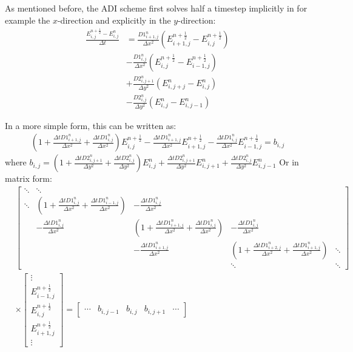 As mentioned before, the ADI scheme first solves half a timestep implicitly in for example the $x$-direction and explicitly in the $y$-direction:
\begin{align}
\frac{E_{i,j}^{n+\frac{1}{2}} - E_{i,j}^{n}}{\Delta t}
 &= \frac{D1_{i+1,j}^{n}}{\Delta x^2} (E_{i+1,j}^{n+\frac{1}{2}} - E_{i,j}^{n+\frac{1}{2}}) \\
 &- \frac{D1_{i,j}^{n}}{\Delta x^2} (E_{i,j}^{n+\frac{1}{2}} - E_{i-1,j}^{n+\frac{1}{2}}) \\
 &+ \frac{D2_{i,j+1}^{n}}{\Delta y^2} (E_{i,j+j}^{n} - E_{i,j}^{n}) \\
 &- \frac{D2_{i,j}^{n}}{\Delta y^2} (E_{i,j}^{n} - E_{i,j-1}^{n})
\end{align}

In a more simple form, this can be written as:
\begin{align}
\left(1 + \frac{\Delta t D1_{i+1,j}^{n}}{\Delta x^2} + \frac{\Delta t D1_{i,j}^{n}}{\Delta x^2} \right) E_{i,j}^{n+\frac{1}{2}} - \frac{\Delta t D1_{i+1,j}^{n}}{\Delta x^2} E_{i+1,j}^{n+\frac{1}{2}} - \frac{\Delta t D1_{i,j}^{n}}{\Delta x^2} E_{i-1,j}^{n+\frac{1}{2}} = b_{i,j}
\end{align}
where $b_{i,j} = \left(1 + \frac{\Delta t D2_{i,j+1}^{n}}{\Delta y^2} + \frac{\Delta t D2_{i,j}^{n}}{\Delta y^2}\right) E_{i,j}^{n} + \frac{\Delta t D2_{i,j+1}^{n}}{\Delta y^2} E_{i,j+1}^{n} + \frac{\Delta t D2_{i,j}^{n}}{\Delta y^2} E_{i,j-1}^{n}$
Or in matrix form:
\begin{align}
&\begin{bmatrix}
\ddots & \ddots & & &\\
\ddots & \left(1 + \frac{\Delta t D1_{i,j}^{n}}{\Delta x^2} + \frac{\Delta t D1_{i-1,j}^{n}}{\Delta x^2} \right) & -\frac{\Delta t D1_{i,j}^{n}}{\Delta x^2} & & \\
& -\frac{\Delta t D1_{i,j}^{n}}{\Delta x^2} & \left(1 + \frac{\Delta t D1_{i+1,j}^{n}}{\Delta x^2} + \frac{\Delta t D1_{i,j}^{n}}{\Delta x^2} \right) & - \frac{\Delta t D1_{i,j}^{n}}{\Delta x^2} & \\
& & -\frac{\Delta t D1_{i+1,j}^{n}}{\Delta x^2} & \left(1 + \frac{\Delta t D1_{i+2,j}^{n}}{\Delta x^2} + \frac{\Delta t D1_{i+1,j}^{n}}{\Delta x^2} \right) & \ddots \\
& & & \ddots & \ddots
\end{bmatrix} \\
&\times
\begin{bmatrix}
           \vdots                    \\
           E_{i-1,j}^{n+\frac{1}{2}} \\
           E_{i,j}^{n+\frac{1}{2}}   \\
           E_{i+1,j}^{n+\frac{1}{2}} \\
           \vdots
\end{bmatrix} 
=
\begin{bmatrix}
           \cdots & b_{i,j-1} & b_{i,j} & b_{i,j+1} & \cdots
\end{bmatrix}
\end{align}
